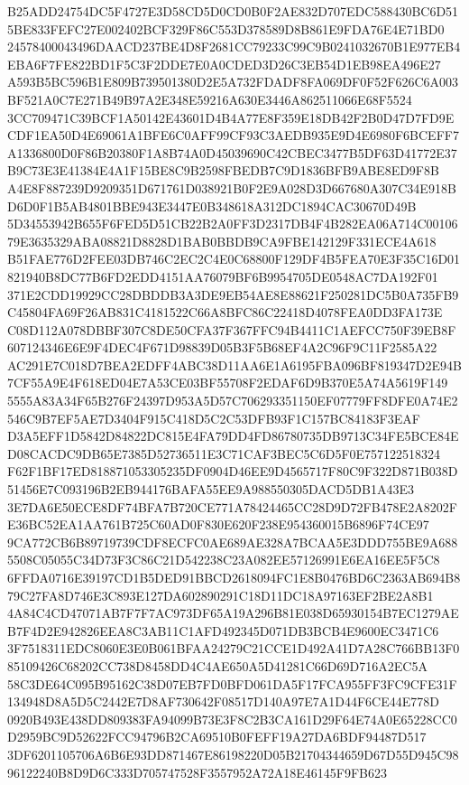\documentclass[UTF8,fontset=fandol,zihao=-4,a4paper]{ctexart}
\begin{document}
{{B25ADD24754DC5F4727E3D58CD5D0CD0B0F2AE832D707EDC588430BC6D515BE833FEFC27E002402BCF329F86C553D378589D8B861E9FDA76E4E71BD0
24578400043496DAACD237BE4D8F2681CC79233C99C9B0241032670B1E977EB4EBA6F7FE822BD1F5C3F2DDE7E0A0CDED3D26C3EB54D1EB98EA496E27
A593B5BC596B1E809B739501380D2E5A732FDADF8FA069DF0F52F626C6A003BF521A0C7E271B49B97A2E348E59216A630E3446A862511066E68F5524
3CC709471C39BCF1A50142E43601D4B4A77E8F359E18DB42F2B0D47D7FD9ECDF1EA50D4E69061A1BFE6C0AFF99CF93C3AEDB935E9D4E6980F6BCEFF7
A1336800D0F86B20380F1A8B74A0D45039690C42CBEC3477B5DF63D41772E37B9C73E3E41384E4A1F15BE8C9B2598FBEDB7C9D1836BFB9ABE8ED9F8B
A4E8F887239D9209351D671761D038921B0F2E9A028D3D667680A307C34E918BD6D0F1B5AB4801BBE943E3447E0B348618A312DC1894CAC30670D49B
5D34553942B655F6FED5D51CB22B2A0FF3D2317DB4F4B282EA06A714C0010679E3635329ABA08821D8828D1BAB0BBDB9CA9FBE142129F331ECE4A618
B51FAE776D2FEE03DB746C2EC2C4E0C68800F129DF4B5FEA70E3F35C16D01821940B8DC77B6FD2EDD4151AA76079BF6B9954705DE0548AC7DA192F01
371E2CDD19929CC28DBDDB3A3DE9EB54AE8E88621F250281DC5B0A735FB9C45804FA69F26AB831C4181522C66A8BFC86C22418D4078FEA0DD3FA173E
C08D112A078DBBF307C8DE50CFA37F367FFC94B4411C1AEFCC750F39EB8F607124346E6E9F4DEC4F671D98839D05B3F5B68EF4A2C96F9C11F2585A22
AC291E7C018D7BEA2EDFF4ABC38D11AA6E1A6195FBA096BF819347D2E94B7CF55A9E4F618ED04E7A53CE03BF55708F2EDAF6D9B370E5A74A5619F149
5555A83A34F65B276F24397D953A5D57C706293351150EF07779FF8DFE0A74E2546C9B7EF5AE7D3404F915C418D5C2C53DFB93F1C157BC84183F3EAF
D3A5EFF1D5842D84822DC815E4FA79DD4FD86780735DB9713C34FE5BCE84ED08CACDC9DB65E7385D52736511E3C71CAF3BEC5C6D5F0E757122518324
F62F1BF17ED818871053305235DF0904D46EE9D4565717F80C9F322D871B038D51456E7C093196B2EB944176BAFA55EE9A988550305DACD5DB1A43E3
3E7DA6E50ECE8DF74BFA7B720CE771A78424465CC28D9D72FB478E2A8202FE36BC52EA1AA761B725C60AD0F830E620F238E954360015B6896F74CE97
9CA772CB6B89719739CDF8ECFC0AE689AE328A7BCAA5E3DDD755BE9A6885508C05055C34D73F3C86C21D542238C23A082EE57126991E6EA16EE5F5C8
6FFDA0716E39197CD1B5DED91BBCD2618094FC1E8B0476BD6C2363AB694B879C27FA8D746E3C893E127DA602890291C18D11DC18A97163EF2BE2A8B1
4A84C4CD47071AB7F7F7AC973DF65A19A296B81E038D65930154B7EC1279AEB7F4D2E942826EEA8C3AB11C1AFD492345D071DB3BCB4E9600EC3471C6
3F7518311EDC8060E3E0B061BFAA24279C21CCE1D492A41D7A28C766BB13F085109426C68202CC738D8458DD4C4AE650A5D41281C66D69D716A2EC5A
58C3DE64C095B95162C38D07EB7FD0BFD061DA5F17FCA955FF3FC9CFE31F134948D8A5D5C2442E7D8AF730642F08517D140A97E7A1D44F6CE44E778D
0920B493E438DD809383FA94099B73E3F8C2B3CA161D29F64E74A0E65228CC0D2959BC9D52622FCC94796B2CA69510B0FEFF19A27DA6BDF94487D517
3DF6201105706A6B6E93DD871467E86198220D05B21704344659D67D55D945C9896122240B8D9D6C333D705747528F3557952A72A18E46145F9FB623
}}
\end{document}
